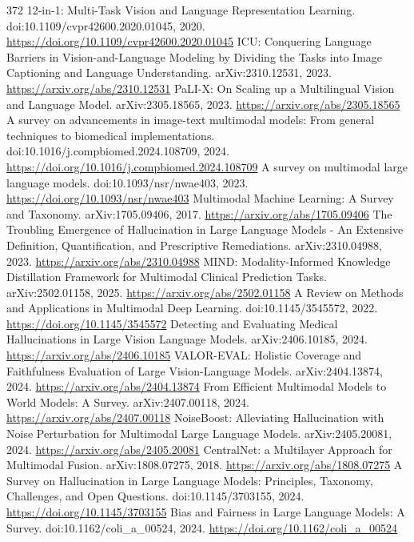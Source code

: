 \documentclass[11pt]{article}
\begin{document}
\begin{thebibliography}{372}
 12-in-1: Multi-Task Vision and Language Representation Learning. doi:10.1109/cvpr42600.2020.01045, 2020. \url{https://doi.org/10.1109/cvpr42600.2020.01045}
 ICU: Conquering Language Barriers in Vision-and-Language Modeling by Dividing the Tasks into Image Captioning and Language Understanding. arXiv:2310.12531, 2023. \url{https://arxiv.org/abs/2310.12531}
 PaLI-X: On Scaling up a Multilingual Vision and Language Model. arXiv:2305.18565, 2023. \url{https://arxiv.org/abs/2305.18565}
 A survey on advancements in image-text multimodal models: From general techniques to biomedical implementations. doi:10.1016/j.compbiomed.2024.108709, 2024. \url{https://doi.org/10.1016/j.compbiomed.2024.108709}
 A survey on multimodal large language models. doi:10.1093/nsr/nwae403, 2023. \url{https://doi.org/10.1093/nsr/nwae403}
 Multimodal Machine Learning: A Survey and Taxonomy. arXiv:1705.09406, 2017. \url{https://arxiv.org/abs/1705.09406}
 The Troubling Emergence of Hallucination in Large Language Models - An Extensive Definition, Quantification, and Prescriptive Remediations. arXiv:2310.04988, 2023. \url{https://arxiv.org/abs/2310.04988}
 MIND: Modality-Informed Knowledge Distillation Framework for Multimodal Clinical Prediction Tasks. arXiv:2502.01158, 2025. \url{https://arxiv.org/abs/2502.01158}
 A Review on Methods and Applications in Multimodal Deep Learning. doi:10.1145/3545572, 2022. \url{https://doi.org/10.1145/3545572}
 Detecting and Evaluating Medical Hallucinations in Large Vision Language Models. arXiv:2406.10185, 2024. \url{https://arxiv.org/abs/2406.10185}
 VALOR-EVAL: Holistic Coverage and Faithfulness Evaluation of Large Vision-Language Models. arXiv:2404.13874, 2024. \url{https://arxiv.org/abs/2404.13874}
 From Efficient Multimodal Models to World Models: A Survey. arXiv:2407.00118, 2024. \url{https://arxiv.org/abs/2407.00118}
 NoiseBoost: Alleviating Hallucination with Noise Perturbation for Multimodal Large Language Models. arXiv:2405.20081, 2024. \url{https://arxiv.org/abs/2405.20081}
 CentralNet: a Multilayer Approach for Multimodal Fusion. arXiv:1808.07275, 2018. \url{https://arxiv.org/abs/1808.07275}
 A Survey on Hallucination in Large Language Models: Principles, Taxonomy, Challenges, and Open Questions. doi:10.1145/3703155, 2024. \url{https://doi.org/10.1145/3703155}
 Bias and Fairness in Large Language Models: A Survey. doi:10.1162/coli\_a\_00524, 2024. \url{https://doi.org/10.1162/coli_a_00524}

\end{thebibliography}
\end{document}
